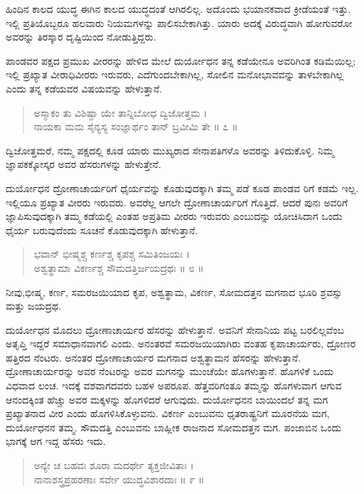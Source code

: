 ಹಿಂದಿನ ಕಾಲದ ಯುದ್ಧ ಈಗಿನ ಕಾಲದ ಯುದ್ಧದಂತೆ ಆಗಿರಲಿಲ್ಲ. ಅದೊಂದು ಭಯಾನಕವಾದ ಕ್ರೀಡೆಯಂತೆ ಇತ್ತು. ಇಲ್ಲಿ ಪ್ರತಿಯೊಬ್ಬರೂ ಹಲವಾರು ನಿಯಮಗಳನ್ನು ಪಾಲಿಸಬೇಕಾಗಿತ್ತು. ಯಾರು ಅದಕ್ಕೆ ವಿರುದ್ಧವಾಗಿ ಹೋಗುವರೋ ಅವರನ್ನು ತಿರಸ್ಕಾರ ದೃಷ್ಟಿಯಿಂದ ನೋಡುತ್ತಿದ್ದರು.

ಪಾಂಡವರ ಪಕ್ಷದ ಪ್ರಮುಖ ವೀರರನ್ನು ಹೇಳಿದ ಮೇಲೆ ದುರ್ಯೋಧನ ತನ್ನ ಕಡೆಯೇನೂ ಅವರಿಗಿಂತ ಕಡಿಮೆಯಿಲ್ಲ; ಇಲ್ಲಿ ಪ್ರಖ್ಯಾತ ವೀರಾಧಿವೀರರು ಇರುವರು, ಎದೆಗುಂದಬೇಕಾಗಿಲ್ಲ, ಸೋಲಿನ ಮನೋಭಾವವನ್ನು ತಾಳಬೇಕಾಗಿಲ್ಲ ಎಂದು ತನ್ನ ಕಡೆಯವರ ವಿಷಯವನ್ನು ಹೇಳುತ್ತಾನೆ.

\begin{verse}
ಅಸ್ಮಾಕಂ ತು ವಿಶಿಷ್ಟಾ ಯೇ ತಾನ್ನಿಬೋಧ ದ್ವಿಜೋತ್ತಮ ।\\ನಾಯಕಾ ಮಮ ಸೈನ್ಯಸ್ಯ ಸಂಜ್ಞಾರ್ಥಂ ತಾನ್ ಬ್ರವೀಮಿ ತೇ \num{॥ ೭ ॥}
\end{verse}

{\small ದ್ವಿಜೋತ್ತಮರೆ, ನಮ್ಮ ಪಕ್ಷದಲ್ಲಿ ಕೂಡ ಯಾರು ಮುಖ್ಯರಾದ ಸೇನಾಪತಿಗಳೊ ಅವರನ್ನು ತಿಳಿದುಕೊಳ್ಳಿ. ನಿಮ್ಮ ಜ್ಞಾಪಕಕ್ಕೋಸ್ಕರ ಅವರ ಹೆಸರುಗಳನ್ನು ಹೇಳುತ್ತೇನೆ.}

ದುರ್ಯೋಧನ ದ್ರೋಣಾಚಾರ್ಯರಿಗೆ ಧೈರ್ಯವನ್ನು ಕೊಡುವುದಕ್ಕಾಗಿ ತಮ್ಮ ಪಡೆ ಕೂಡ ಪಾಂಡವ ರಿಗೆ ಕಡಮೆ ಇಲ್ಲ. ಇಲ್ಲಿಯೂ ಪ್ರಖ್ಯಾತ ವೀರರು ಇರುವರು. ಅವರೆಲ್ಲ ಆಗಲೇ ದ್ರೋಣಾಚಾರ್ಯರಿಗೆ ಗೊತ್ತಿದೆ. ಆದರೆ ಪುನಃ ಅವರಿಗೆ ಜ್ಞಾಪಿಸುವುದಕ್ಕಾಗಿ ತಮ್ಮ ಕಡೆಯಲ್ಲಿ ಎಂತಹ ಅಪ್ರತಿಮ ವೀರರು ಇರುವರು ಎಂಬುದನ್ನು ಯೋಚಿಸಿದಾಗ ಒಂದು ಧೈರ್ಯ ಬರುವುದೆಂದು ಸೂಚನೆ ಕೊಡುವುದಕ್ಕಾಗಿ ಹೇಳುತ್ತಾನೆ.

\begin{verse}
ಭವಾನ್ ಭೀಷ್ಮಶ್ಚ ಕರ್ಣಶ್ಚ ಕೃಪಶ್ಚ ಸಮಿತಿಂಜಯಃ ।\\ಅಶ್ವತ್ಥಾಮಾ ವಿಕರ್ಣಶ್ಚ ಸೌಮದತ್ತಿರ್ಜಯದ್ರಥಃ \num{॥ ೮ ॥}
\end{verse}

{\small ನೀವು,ಭೀಷ್ಮ, ಕರ್ಣ, ಸಮರಜಯಿಯಾದ ಕೃಪ, ಅಶ್ವತ್ಥಾಮ, ವಿಕರ್ಣ, ಸೋಮದತ್ತನ ಮಗನಾದ ಭೂರಿ ಶ್ರವಸ್ಸು ಮತ್ತು ಜಯದ್ರಥ.}

ದುರ್ಯೋಧನ ಮೊದಲು ದ್ರೋಣಾಚಾರ್ಯರ ಹೆಸರನ್ನು ಹೇಳುತ್ತಾನೆ. ಅವನಿಗೆ ಸೇನಾನಿಯ ಪಟ್ಟ ಬರಲಿಲ್ಲವೆಂಬ ಅತೃಪ್ತಿ ಇದ್ದರೆ ಸಮಾಧಾನವಾಗಲಿ ಎಂದು. ಅನಂತರವೆ ಸಮರಜಯಿಯಾಗಿರು ವಂತಹ ಕೃಪಾಚಾರ್ಯರು, ದ್ರೋಣರ ಹತ್ತಿರದ ನೆಂಟರು. ಅನಂತರ ದ್ರೋಣಾಚಾರ್ಯರ ಮಗನಾದ ಅಶ್ವತ್ಥಾಮನ ಹೆಸರನ್ನು ಹೇಳುತ್ತಾನೆ. ದ್ರೋಣಾಚಾರ್ಯರನ್ನು ಅವರ ನೆಂಟರನ್ನು ಅವರ ಮಗನನ್ನು ಮುಂಚೆಯೇ ಹೊಗಳುತ್ತಾನೆ. ಹೊಗಳಿಕೆ ಒಂದು ವಿಧವಾದ ಲಂಚ. ಇದಕ್ಕೆ ವಶವಾಗದವರು ಬಹಳ ಅಪರೂಪ. ಹೆತ್ತವರಿಗಂತೂ ತಮ್ಮನ್ನು ಹೊಗಳುವಾಗ ಆಗುವ ಆನಂದಕ್ಕಿಂತ ಹೆಚ್ಚು ಅವರ ಮಕ್ಕಳನ್ನು ಹೊಗಳಿದರೆ ಆಗುವುದು. ದುರ್ಯೋಧನನ ಬಾಯಿಂದಲೆ ತನ್ನ ಮಗ ಪ್ರಖ್ಯಾತನಾದ ವೀರ ಎಂದು ಹೊಗಳಿಸಿಕೊಳ್ಳುವನು. ವಿಕರ್ಣ ಎಂಬುವನು ಧೃತರಾಷ್ಟ್ರನಿಗೆ ಮೂರನೆಯ ಮಗ, ದುರ್ಯೋಧನನ ತಮ್ಮ. ಸೌಮದತ್ತಿ ಎಂಬುವನು ಬಾಹ್ಲೀಕ ರಾಜನಾದ ಸೋಮದತ್ತನ ಮಗ. ಪಂಜಾಬಿನ ಒಂದು ಭಾಗಕ್ಕೆ ಆಗ ಇದ್ದ ಹೆಸರು ಇದು.

\begin{verse}
ಅನ್ಯೇ ಚ ಬಹವಃ ಶೂರಾ ಮದರ್ಥೇ ತ್ಯಕ್ತಜೀವಿತಾಃ ।\\ನಾನಾಶಸ್ತ್ರಪ್ರಹರಣಾಃ ಸರ್ವೇ ಯುದ್ಧವಿಶಾರದಾಃ \num{॥ ೯ ॥}
\end{verse}


